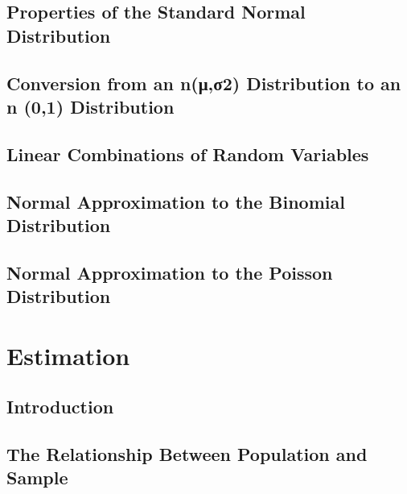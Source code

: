 \documentclass[12pt,]{article}
\begin{document}
\hypertarget{properties-of-the-standard-normal-distribution}{%
\subsection{Properties of the Standard Normal
Distribution}\label{properties-of-the-standard-normal-distribution}}

\hypertarget{conversion-from-an-n2-distribution-to-an-n-01-distribution}{%
\subsection{Conversion from an n(μ,σ2) Distribution to an n (0,1)
Distribution}\label{conversion-from-an-n2-distribution-to-an-n-01-distribution}}

\hypertarget{linear-combinations-of-random-variables}{%
\subsection{Linear Combinations of Random
Variables}\label{linear-combinations-of-random-variables}}

\hypertarget{normal-approximation-to-the-binomial-distribution}{%
\subsection{Normal Approximation to the Binomial
Distribution}\label{normal-approximation-to-the-binomial-distribution}}

\hypertarget{normal-approximation-to-the-poisson-distribution}{%
\subsection{Normal Approximation to the Poisson
Distribution}\label{normal-approximation-to-the-poisson-distribution}}

\hypertarget{estimation}{%
\section{Estimation}\label{estimation}}

\hypertarget{introduction-2}{%
\subsection{Introduction}\label{introduction-2}}

\hypertarget{the-relationship-between-population-and-sample}{%
\subsection{The Relationship Between Population and
Sample}\label{the-relationship-between-population-and-sample}}
\end{document}

